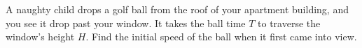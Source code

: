 %
A naughty child drops a golf ball from the roof of your apartment building,
and you see it drop past your window.
It takes the ball time $T$ to traverse the window's
height $H$. Find the initial speed of the ball when it first came into view.\answercheck
